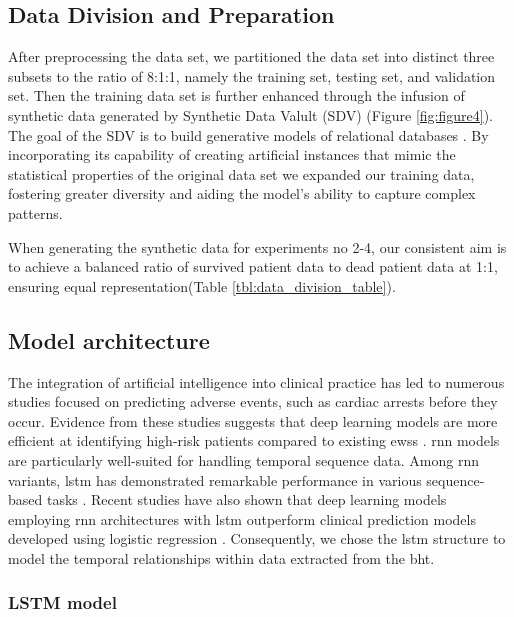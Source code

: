 \documentclass[journal,article,submit,pdftex,moreauthors]{Definitions/mdpi}
\begin{document}
\subsection{Data Division and Preparation}
After preprocessing the data set, we partitioned the data set into distinct three subsets to the ratio of 8:1:1, namely the training set, testing set, and validation set. Then the training data set is further enhanced through the infusion of synthetic data generated by Synthetic Data Valult (SDV) (Figure \ref{fig:figure4}). The goal of the SDV is to build generative models of relational databases \cite{a14}. By incorporating its capability of creating artificial instances that mimic the statistical properties of the original data set we expanded our training data, fostering greater diversity and aiding the model's ability to capture complex patterns.

When generating the synthetic data for experiments no 2-4, our consistent aim is to achieve a balanced ratio of survived patient data to dead patient data at 1:1, ensuring equal representation(Table \ref{tbl:data_division_table}).



\subsection{Model architecture}

The integration of artificial intelligence into clinical practice has led to numerous studies focused on predicting adverse events, such as cardiac arrests before they occur. Evidence from these studies suggests that deep learning models are more efficient at identifying high-risk patients compared to existing \glspl{ews} \cite{b14}. \Gls{rnn} models are particularly well-suited for handling temporal sequence data. Among \gls{rnn} variants, \gls{lstm} has demonstrated remarkable performance in various sequence-based tasks \cite{b15}. Recent studies have also shown that deep learning models employing \gls{rnn} architectures with \gls{lstm} outperform clinical prediction models developed using logistic regression \cite{b16,b17}. Consequently, we chose the \gls{lstm} structure to model the temporal relationships within data extracted from the \gls{bht}.

\subsubsection{LSTM model}
\end{document}
